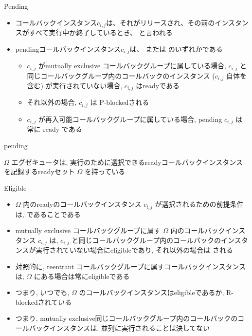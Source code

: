 \begin{frame}{Pending}


    \begin{itemize}
        \item コールバックインスタンス$c_{i, j}$は、それがリリースされ、その前のインスタンスがすべて実行中か終了しているとき、 と言われる
        \item pendingコールバックインスタンス$c_{i, j}$は、 または のいずれかである
              \begin{itemize}
                  \item  $c_{i, j}$ がmutually exclusive コールバックグループに属している場合, $c_{i, j}$ と同じコールバックグループ内のコールバックのインスタンス ($c_{i, j}$ 自体を含む) が実行されていない場合, $c_{i, j}$ はreadyである
                  \item それ以外の場合, $c_{i, j}$ は P-blockedされる

                  \item  $c_{i, j}$ が再入可能コールバックグループに属している場合, pending $c_{i, j}$ は常に ready である
              \end{itemize}
    \end{itemize}
\end{frame}

\begin{frame}{pending}
\end{frame}

\begin{frame}{$\Omega$}
    エグゼキュータは, 実行のために選択できるreadyコールバックインスタンスを記録するreadyセット $\Omega$ を持っている
\end{frame}

\begin{frame}{Eligible}
    \begin{itemize}
        \item $\Omega$ 内のreadyのコールバックインスタンス $c_{i, j}$ が選択されるための前提条件は, であることである
        \item mutually exclusive コールバックグループに属す $\Omega$ 内のコールバックインスタンス $c_{i, j}$ は, $c_{i, j}$ と同じコールバックグループ内のコールバックのインスタンスが実行されていない場合にeligibleであり, それ以外の場合は される
        \item 対照的に, reentrant コールバックグループに属すコールバックインスタンスは, $\Omega$ にある場合は常にeligibleである
        \item つまり, いつでも, $\Omega$ のコールバックインスタンスはeligibleであるか, R-blockedされている
        \item つまり, mutually exclusive同じコールバックグループ内のコールバックのコールバックインスタンスは, 並列に実行されることは決してない
    \end{itemize}
\end{frame}

